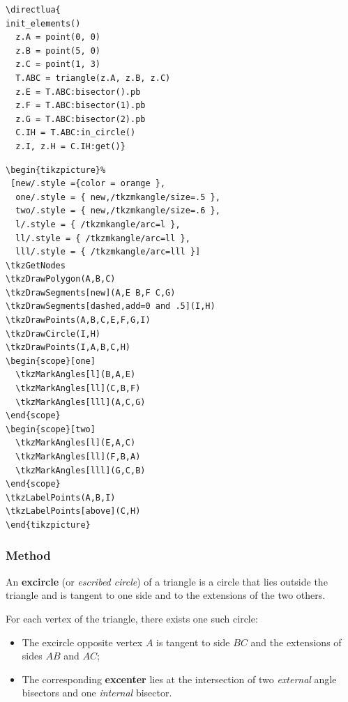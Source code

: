 \begin{minipage}{.5\textwidth}
\begin{verbatim}
\directlua{
init_elements()
  z.A = point(0, 0)
  z.B = point(5, 0)
  z.C = point(1, 3)
  T.ABC = triangle(z.A, z.B, z.C)
  z.E = T.ABC:bisector().pb
  z.F = T.ABC:bisector(1).pb
  z.G = T.ABC:bisector(2).pb
  C.IH = T.ABC:in_circle()
  z.I, z.H = C.IH:get()}
\end{verbatim}
\end{minipage}
\begin{minipage}{.5\textwidth}
\begin{verbatim}
\begin{tikzpicture}%
 [new/.style ={color = orange },
  one/.style = { new,/tkzmkangle/size=.5 },
  two/.style = { new,/tkzmkangle/size=.6 },
  l/.style = { /tkzmkangle/arc=l },
  ll/.style = { /tkzmkangle/arc=ll },
  lll/.style = { /tkzmkangle/arc=lll }]
\tkzGetNodes
\tkzDrawPolygon(A,B,C)
\tkzDrawSegments[new](A,E B,F C,G)
\tkzDrawSegments[dashed,add=0 and .5](I,H)
\tkzDrawPoints(A,B,C,E,F,G,I)
\tkzDrawCircle(I,H)
\tkzDrawPoints(I,A,B,C,H)
\begin{scope}[one]
  \tkzMarkAngles[l](B,A,E)
  \tkzMarkAngles[ll](C,B,F)
  \tkzMarkAngles[lll](A,C,G)
\end{scope}
\begin{scope}[two]
  \tkzMarkAngles[l](E,A,C)
  \tkzMarkAngles[ll](F,B,A)
  \tkzMarkAngles[lll](G,C,B)
\end{scope}
\tkzLabelPoints(A,B,I)
\tkzLabelPoints[above](C,H)
\end{tikzpicture}
\end{verbatim}
\end{minipage}

\subsubsection{Method } %
\label{ssub:method_triangle_ex__circle}

An \textbf{excircle} (or \emph{escribed circle}) of a triangle is a circle that lies outside the triangle and is tangent to one side and to the extensions of the two others.

\medskip

For each vertex of the triangle, there exists one such circle:
\begin{itemize}
  \item The excircle opposite vertex $A$ is tangent to side $BC$ and the extensions of sides $AB$ and $AC$;
  \item The corresponding \textbf{excenter} lies at the intersection of two \emph{external} angle bisectors and one \emph{internal} bisector.
\end{itemize}


